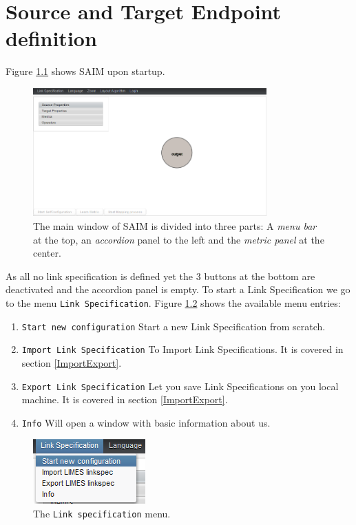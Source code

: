 \documentclass[oneside,a4paper,12pt]{memoir}
\begin{document}
\chapter{Source and Target Endpoint definition}
\label{kbdefinition}
	Figure \ref{fig:MainWindow} shows SAIM upon startup.
	\begin{figure}
		\centering
		\includegraphics[width=0.8\textwidth]{images/main.png}
		\caption{The main window of SAIM is divided into three parts: A \emph{menu bar} at the top, an \emph{accordion} panel to the left and the \emph{metric panel} at the center.}
		\label{fig:MainWindow}
	\end{figure}
	As all no link specification is defined yet the 3 buttons at the bottom are deactivated and the accordion panel is empty. To start a Link Specification we go to the menu \texttt{Link Specification}. Figure \ref{fig:menu_start} shows the available menu entries:	
	\begin{enumerate}
		\item \texttt{Start new configuration} Start a new Link Specification from scratch.
		\item \texttt{Import Link Specification} To Import Link Specifications. It is covered in section \ref{ImportExport}.
		\item \texttt{Export Link Specification} Let you save Link Specifications on you local machine. It is covered in section \ref{ImportExport}.
		\item \texttt{Info} Will open a window with basic information about us.
	\end{enumerate}
	\begin{figure}
		\centering
		\includegraphics{images/menu_start.png}
		\caption{The \texttt{Link specification} menu.}
		\label{fig:menu_start}
	\end{figure}
	
\end{document}
